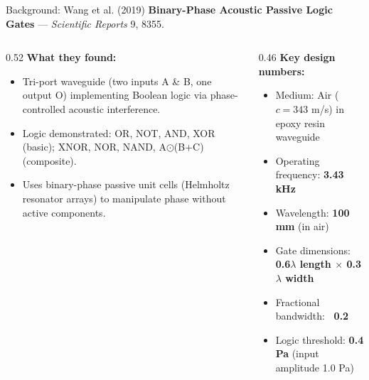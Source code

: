 \documentclass[aspectratio=169,11pt]{beamer}
\begin{document}
\begin{frame}{Background: Wang et al. (2019)}
  \textbf{Binary-Phase Acoustic Passive Logic Gates} — \textit{Scientific Reports} 9, 8355.

  \vspace{0.15cm}
  \footnotesize
  \begin{columns}[T]
    \begin{column}{0.52\textwidth}
      \textbf{What they found:}
      \begin{itemize}
        \item Tri-port waveguide (two inputs A \& B, one output O) implementing Boolean logic via phase-controlled acoustic interference.
        \item Logic demonstrated: OR, NOT, AND, XOR (basic); XNOR, NOR, NAND, A$\odot$(B+C) (composite).
        \item Uses binary-phase passive unit cells (Helmholtz resonator arrays) to manipulate phase without active components.
      \end{itemize}
    \end{column}
    \begin{column}{0.46\textwidth}
      \textbf{Key design numbers:}
      \begin{itemize}
        \item Medium: Air ($c = 343$ m/s) in epoxy resin waveguide
        \item Operating frequency: \textbf{3.43 kHz}
        \item Wavelength: \textbf{100 mm} (in air)
        \item Gate dimensions: \textbf{0.6$\lambda$ length $\times$ 0.3$\lambda$ width}
        \item Fractional bandwidth: \textbf{~0.2}
        \item Logic threshold: \textbf{0.4 Pa} (input amplitude 1.0 Pa)
      \end{itemize}
    \end{column}
  \end{columns}

\end{frame}
\end{document}
